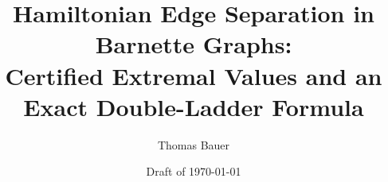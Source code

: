 \documentclass[11pt]{article}
\title{Hamiltonian Edge Separation in Barnette Graphs:\\
Certified Extremal Values and an Exact Double-Ladder Formula}
\author{Thomas Bauer}
\date{Draft of \today}
\theoremstyle{definition}
\theoremstyle{remark}
\begin{document}
\maketitle

\begin{abstract}

\end{abstract}


















\end{document}
